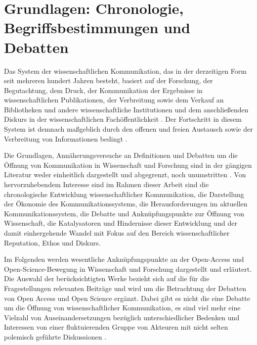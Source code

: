 \chapter{Grundlagen: Chronologie, Begriffsbestimmungen und Debatten}

Das System der wissenschaftlichen Kommunikation, das in der derzeitigen Form seit mehreren hundert Jahren besteht, basiert auf der Forschung, der Begutachtung, dem Druck, der Kommunikation der Ergebnisse in wissenschaftlichen Publikationen, der Verbreitung sowie dem Verkauf an Bibliotheken und andere wissenschaftliche Institutionen \cite{cite:11a} und dem anschließenden Diskurs in der wissenschaftlichen Fachöffentlichkeit \cite{bbaw_publizieren_2015}. Der Fortschritt in diesem System ist demnach maßgeblich durch den offenen und freien Austausch sowie der Verbreitung von Informationen bedingt \cite{cite:11}.

Die Grundlagen, Annäherungsversuche an Definitionen und Debatten um die Öffnung von Kommunikation in Wissenschaft und Forschung sind in der gängigen Literatur weder einheitlich dargestellt und abgegrenzt, noch unumstritten \cite{muller_2010_open} \cite{schulze_2013_open}. Von hervorzuhebendem Interesse sind im Rahmen dieser Arbeit sind die chronologische Entwicklung wissenschaftlicher Kommunikation, die Darstellung der Ökonomie des Kommunikationssystems, die Herausforderungen im aktuellen Kommunikationssystem, die Debatte und Anknüpfungspunkte zur Öffnung von Wissenschaft, die Katalysatoren und Hindernisse dieser Entwicklung und der damit einhergehende Wandel mit Fokus auf den Bereich wissenschaftlicher Reputation, Ethos und Diskurs.

Im Folgenden werden wesentliche Anknüpfungspunkte an der Open-Access und Open-Science-Bewegung in Wissenschaft und Forschung dargestellt und erläutert. Die Auswahl der berücksichtigten Werke bezieht sich auf die für die Fragestellungen relevanten Beiträge und wird um die Betrachtung der Debatten von Open Access und Open Science ergänzt. Dabei gibt es nicht die eine Debatte um die Öffnung von wissenschaftlicher Kommunikation, es sind viel mehr eine Vielzahl von Auseinandersetzungen bezüglich unterschiedlicher Bedenken und Interessen von einer fluktuierenden Gruppe von Akteuren \cite{Beals_2013} mit nicht selten polemisch geführte Diskussionen \cite{Lossau_oa_2007} \cite{naeder_2010_open}.

